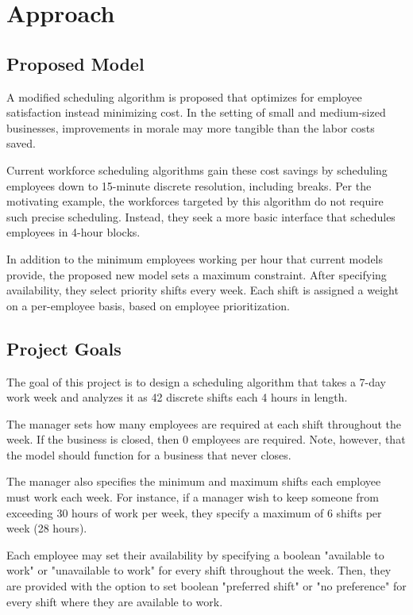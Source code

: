 \chapter{Approach}
\section{Proposed Model}
A modified scheduling algorithm is proposed that optimizes for employee satisfaction instead minimizing cost. In the setting of small and medium-sized businesses, improvements in morale may more tangible than the labor costs saved.

Current workforce scheduling algorithms gain these cost savings by scheduling employees down to 15-minute discrete resolution, including breaks. Per the motivating example, the workforces targeted by this algorithm do not require such precise scheduling. Instead, they seek a more basic interface that schedules employees in 4-hour blocks. 

In addition to the minimum employees working per hour that current models  provide, the proposed new model sets a maximum constraint. After specifying availability, they select priority shifts every week. Each shift is assigned a weight on a per-employee basis, based on employee prioritization.

\section{Project Goals}

The goal of this project is to design a scheduling algorithm that takes a 7-day work week and analyzes it as 42 discrete shifts each 4 hours in length. 

The manager sets how many employees are required at each shift throughout the week. If the business is closed, then 0 employees are required. Note, however, that the model should function for a business that never closes. 

The manager also specifies the minimum and maximum shifts each employee must work each week. For instance, if a manager wish to keep someone from exceeding 30 hours of work per week, they specify a maximum of 6 shifts per week (28 hours).

Each employee may set their availability by specifying a boolean "available to work" or "unavailable to work" for every shift throughout the week. Then, they are provided with the option to set boolean "preferred shift" or "no preference" for every shift where they are available to work. 

